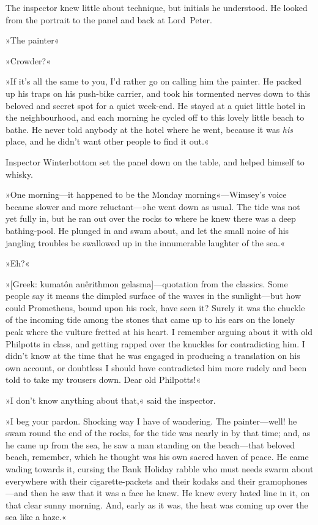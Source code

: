 The inspector knew little about technique, but initials he understood. He looked from the portrait to the panel and back at Lord~Peter.

»The painter\longdash«

»Crowder?«

»If it's all the same to you, I'd rather go on calling him the painter. He packed up his traps on his push-bike carrier, and took his tormented nerves down to this beloved and secret spot for a quiet week-end. He stayed at a quiet little hotel in the neighbourhood, and each morning he cycled off to this lovely little beach to bathe. He never told anybody at the hotel where he went, because it was \textit{his} place, and he didn't want other people to find it out.«

Inspector Winterbottom set the panel down on the table, and helped himself to whisky.

»One morning—it happened to be the Monday morning«—Wimsey's voice became slower and more reluctant—»he went down as usual. The tide was not yet fully in, but he ran out over the rocks to where he knew there was a deep bathing-pool. He plunged in and swam about, and let the small noise of his jangling troubles be swallowed up in the innumerable laughter of the sea.«

»Eh?«

»[Greek: kumatôn anêrithmon gelasma]—quotation from the classics. Some people say it means the dimpled surface of the waves in the sunlight—but how could Prometheus, bound upon his rock, have seen it? Surely it was the chuckle of the incoming tide among the stones that came up to his ears on the lonely peak where the vulture fretted at his heart. I remember arguing about it with old Philpotts in class, and getting rapped over the knuckles for contradicting him. I didn't know at the time that he was engaged in producing a translation on his own account, or doubtless I should have contradicted him more rudely and been told to take my trousers down. Dear old Philpotts!«

»I don't know anything about that,« said the inspector.

»I beg your pardon. Shocking way I have of wandering. The painter—well! he swam round the end of the rocks, for the tide was nearly in by that time; and, as he came up from the sea, he saw a man standing on the beach—that beloved beach, remember, which he thought was his own sacred haven of peace. He came wading towards it, cursing the Bank Holiday rabble who must needs swarm about everywhere with their cigarette-packets and their kodaks and their gramophones—and then he saw that it was a face he knew. He knew every hated line in it, on that clear sunny morning. And, early as it was, the heat was coming up over the sea like a haze.«

